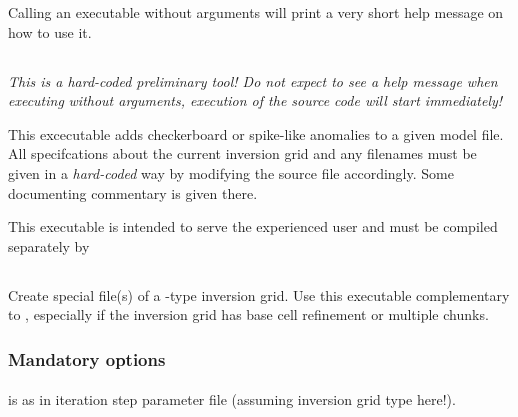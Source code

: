 Calling an executable without arguments will print a very short help message on how to use it.
%
%
\subsection{} \label{programs_scripts,sec:bin_prog,sec:addSpikeCheckerToKim}
\emph{This is a hard-coded preliminary tool! Do not expect to see a help message when executing} 
 \emph{without arguments, execution of the source code will start 
immediately!}

This excecutable adds checkerboard or spike-like anomalies to a given  model file. All 
specifcations about the current inversion grid and any filenames must be given in a \emph{hard-coded}
way by modifying the source file  accordingly. Some documenting
commentary is given there. 

This executable is intended to serve the experienced user and must be compiled separately by\\
%
\subsection{} \label{programs_scripts,sec:bin_prog,sec:chunks_invgrid_2_vtk}
Create special  file(s) of a -type inversion grid.
Use this executable complementary to  , 
especially if the inversion grid has base cell refinement or multiple chunks. 

\subsubsection{Mandatory options}
\paragraph{}
 is  as in \ASKI{} iteration step parameter file (assuming
inversion grid type  here!).

